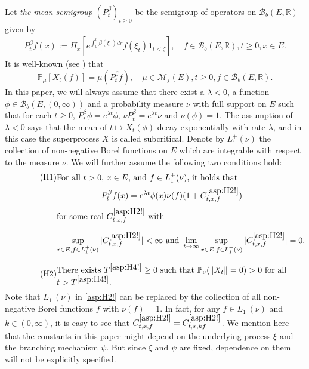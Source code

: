 \documentclass[12pt,a4paper]{amsart}
\numberwithin{equation}{section}
\theoremstyle{plain}
\theoremstyle{definition}
\theoremstyle{remark}
\begin{document}
	Let \emph{the mean semigroup} $(P_t^\beta)_{t\geq 0}$ be the semigroup of operators on $\mathcal B_b(E,\mathbb R)$ given by
\begin{align}
	P_t^\beta f(x)
	:= \Pi_x\left[e^{\int_0^t \beta(\xi_r)dr }f(\xi_t) \mathbf 1_{t < \zeta}\right],
	\quad f\in \mathcal B_b(E,\mathbb R), t\geq 0, x\in E.
\end{align}
	It is well-known (see \cite[Proposition 2.27]{Li2011MeasureValued}) that
\begin{equation} \label{Fact:M!}
	\mathbb P_\mu[X_t(f)] = \mu (P_t^\beta f),
	\quad \mu \in \mathcal M_f(E), t\geq 0, f \in \mathcal B_b(E,\mathbb R).
\end{equation}	
	In this paper, we will always assume that there exist a $\lambda<0$, a function $\phi \in \mathcal B_b(E,(0,\infty))$ and a probability measure $\nu$ with full support on $E$ such that for each $t\geq 0$, $P_t^\beta \phi = e^{\lambda t}\phi$, $\nu P_t^\beta = e^{\lambda t} \nu$ and $\nu(\phi) = 1$.
	The assumption of $\lambda<0$ says that the mean of $t\mapsto X_t(\phi)$ decay exponentially with rate $\lambda$, and in this case the superprocess $X$ is called subcritical.
	Denote by $L_1^+(\nu)$ the collection of
	non-negative Borel functions on $E$ which are integrable with respect to the measure $\nu$.
	We will further assume the following two conditions hold:
\begin{align}
\label{asp:H2!} \tag{H1}
&\begin{minipage}{0.8\textwidth}
	For all $t>0$, $x\in E$, and $f\in L_1^+(\nu)$, it holds that
\end{minipage}
\\
&\begin{minipage}{0.8\textwidth}
	\[ P_t^\beta f(x) = e^{\lambda t} \phi(x) \nu(f) (1+ C^{\eqref{asp:H2!}}_{t,x,f})\]
	for some real $C^{\eqref{asp:H2!}}_{t,x,f}$ with 
	\[\sup_{x\in E, f\in L_1^+(\nu)} |C^{\eqref{asp:H2!}}_{t,x,f}| < \infty
	\mbox{ and }
	\lim_{t\to \infty} \sup_{x\in E, f\in L_1^+(\nu)} |C^{\eqref{asp:H2!}}_{t,x,f}| = 0.\]
\end{minipage}
\end{align}

\begin{equation}
\label{asp:H4!} \tag{H2}
\begin{minipage}{0.8\textwidth}
	There exists  $T^{\eqref{asp:H4!}}\geq 0$ such that $\mathbb P_\nu(\|X_t\| = 0)>0$ for all $t> T^{\eqref{asp:H4!}}$.
\end{minipage}
\end{equation}
	Note that $L_1^+(\nu)$ in \eqref{asp:H2!} can be replaced by the collection of all non-negative Borel functions $f$ with $\nu(f) = 1$.
	In fact, for any $f\in L_1^+(\nu)$ and $k \in (0,\infty)$, it is easy to see that $C^{\eqref{asp:H2!}}_{t,x,f} = C^{\eqref{asp:H2!}}_{t,x,kf}$.
	We  mention here that the constants in this paper might depend on the underlying process $\xi$ and the branching mechanism $\psi$. But since $\xi$ and $\psi$ are fixed, dependence on them will not be explicitly specified.
\end{document}
